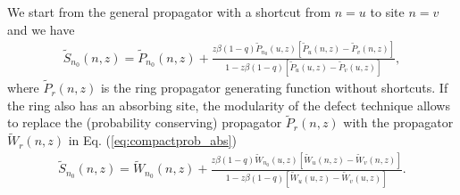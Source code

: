 \documentclass[10pt, hidelinks, superscriptaddress, amsmath, amssymb, aps, pre]{revtex4-2}
\begin{document}
We start from the general propagator with a shortcut from $n=u$ to site $n=v$ and we have
\begin{align}
\widetilde{S}_{n_0}(n,z)=\widetilde{P}_{n_0}(n,z)+\frac{z\beta (1-q)\widetilde{P}_{n_0}(u,z)\left[\widetilde{P}_{u}(n,z)-\widetilde{P}_{v}(n,z)\right]}{1-z\beta(1-q)\left[\widetilde{P}_{u}(u,z)-\widetilde{P}_{v}(u,z)\right]},
\label{eq:one_def_prop}
\end{align}
where $\widetilde{P}_{r}(n,z)$ is the ring propagator generating function without shortcuts. If the ring also has an absorbing site, the modularity of the defect technique allows to replace the (probability conserving) propagator $\widetilde{P}_{r}(n,z)$ with the propagator $\widetilde{W}_{r}(n,z)$ in Eq. (\ref{eq:compactprob_abs})
\begin{align}
\widetilde{S}_{n_0}(n,z)=\widetilde{W}_{n_0}(n,z)+\frac{z\beta (1-q)\widetilde{W}_{n_0}(u,z)\left[\widetilde{W}_{u}(n,z)-\widetilde{W}_{v}(n,z)\right]}{1-z\beta(1-q)\left[\widetilde{W}_{u}(u,z)-\widetilde{W}_{v}(u,z)\right]}.
\label{eq:one_def_prop_abs}
\end{align}
\end{document}
